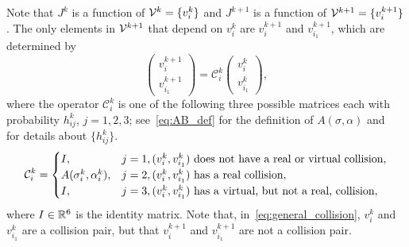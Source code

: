 \documentclass[12pt,nopreprintline]{elsarticle}
\newcommand{\red}{\textcolor{red}}
\begin{document}




Note that $J^k$ is a function of ${\cal V}^k = \{v_i^k\}$ and  $J^{k+1}$ is a function of ${\cal V}^{k+1} = \{v_i^{k+1}\}$. 
The only elements in ${\cal V}^{k+1}$ that depend on $v_i^k$ are $v_i^{k+1}$ and $v_{i_1}^{k+1}$, which are determined by 
\begin{equation} \label{eq:general_collision}
\begin{pmatrix}
v_i^{k+1}\\
v_{i_1}^{k+1}
\end{pmatrix} = 
\mathcal{C}^k_{i} 
\begin{pmatrix}
v_i^{k}\\
v_{i_1}^{k}
\end{pmatrix},
\end{equation}
where the operator $\mathcal{C}_{i}^k$ is one of the following three possible matrices each with probability $h_{ij}^k$, $j=1,2,3$; see~\eqref{eq:AB_def} for the definition of $A(\sigma,\alpha)$ and~ for details about $\{h_{ij}^k\}$.
\begin{equation}\label{eq:collision_operator}
{\cal C}_i^k = 
    \begin{cases}
    I,  & j=1, \text{$(v_i^k,v_{i_1}^k)$ does not have a real or virtual collision}, \\
     A(\sigma_i^k, \alpha_i^k), & j=2,  \text{$(v_i^k,v_{i_1}^k)$ has a real collision},\\
    I, & j=3,  \text{$(v_i^k,v_{i_1}^k)$ has a virtual, but not a real, collision},
    \end{cases}
\end{equation}
where $I \in \mathbb{R}^{6\time 6}$ is the identity matrix. Note that, in~\eqref{eq:general_collision}, $v_i^{k}$ and $v_{i_1}^{k}$ are a collision pair, but that $v_i^{k+1}$ and $v_{i_1}^{k+1}$ are not a collision pair. 
\end{document}
